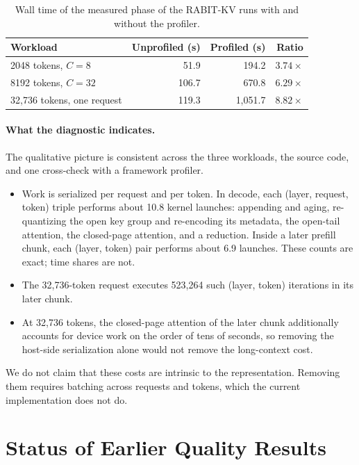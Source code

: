 \documentclass{article}
\begin{document}
\begin{table}[h]
\centering
\small
\setlength{\tabcolsep}{3.5pt}
\begin{tabular}{@{}lrrr@{}}
\toprule
Workload & Unprofiled (s) & Profiled (s) & Ratio \\
\midrule
2048 tokens, $C{=}8$ & 51.9 & 194.2 & $3.74\times$ \\
8192 tokens, $C{=}32$ & 106.7 & 670.8 & $6.29\times$ \\
32,736 tokens, one request & 119.3 & 1,051.7 & $8.82\times$ \\
\bottomrule
\end{tabular}
\caption{Wall time of the measured phase of the RABIT-KV runs with and without the profiler.}
\label{tab:app-prof}
\end{table}

\paragraph{What the diagnostic indicates.}
The qualitative picture is consistent across the three workloads, the source code, and one
cross-check with a framework profiler.
\begin{itemize}
\item Work is serialized per request and per token. In decode, each (layer, request, token)
  triple performs about 10.8 kernel launches: appending and aging, re-quantizing the open key group
  and re-encoding its metadata, the open-tail attention, the closed-page attention, and a reduction.
  Inside a later prefill chunk, each (layer, token) pair performs about 6.9 launches. These counts are
  exact; time shares are not.
\item The 32,736-token request executes 523,264 such (layer, token) iterations in its later chunk.
\item At 32,736 tokens, the closed-page attention of the later chunk additionally accounts for device
  work on the order of tens of seconds, so removing the host-side serialization alone would not remove
  the long-context cost.
\end{itemize}
We do not claim that these costs are intrinsic to the representation. Removing them requires batching
across requests and tokens, which the current implementation does not do.

\section{Status of Earlier Quality Results}
\label{app:legacy}
\end{document}
